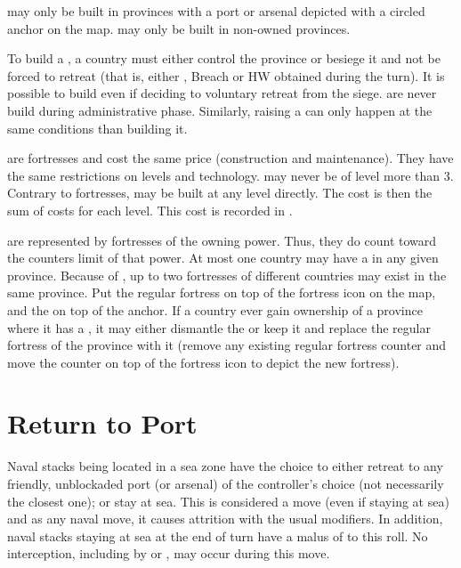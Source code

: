 \label{chRedep:BuildPresidios}
\bparag \Presidios may only be built in provinces with a port or arsenal
depicted with a circled anchor on the map.
\bparag \Presidios may only be built in non-owned provinces.

\bparag To build a \Presidio, a country must either control the province or
besiege it and not be forced to retreat (that is, either \USURE\Faceplus,
Breach or HW obtained during the turn).
\bparag It is possible to build \Presidio even if deciding to voluntary
retreat from the siege.
\bparag \Presidios are never build during administrative phase. Similarly,
raising a \Presidio can only happen at the same conditions than building it.

\aparag[Cost]
\bparag \Presidios are fortresses and cost the same price (construction and
maintenance). They have the same restrictions on levels and technology.
\bparag \Presidios may never be of level more than 3.
\bparag Contrary to fortresses, \Presidios may be built at any level
directly. The cost is then the sum of costs for each level.
\bparag This cost is recorded in .

\bparag \Presidios are represented by fortresses of the owning power. Thus,
they do count toward the counters limit of that power.
\bparag At most one country may have a \Presidio in any given province.
\bparag Because of \Presidios, up to two fortresses of different countries may
exist in the same province. Put the regular fortress on top of the fortress
icon on the map, and the \Presidio on top of the anchor.
\bparag If a country ever gain ownership of a province where it has a
\Presidio, it may either dismantle the \Presidio or keep it and replace the
regular fortress of the province with it (remove any existing regular fortress
counter and move the \Presidio counter on top of the fortress icon to depict
the new fortress).


\section{Return to Port}\label{chRedep:Return port}

\aparag[Navies]
\bparag Naval stacks being located in a sea zone have the choice to either
\bparag retreat to any friendly, unblockaded port (or arsenal) of the
controller's choice (not necessarily the closest one);
\bparag or stay at sea.
\bparag This is considered a move (even if staying at sea) and as any naval
move, it causes attrition with the usual modifiers.
\bparag In addition, naval stacks staying at sea at the end of turn have a
malus of  to this roll.
\bparag No interception, including by \Presidios or \StraitFort, may occur
during this move.

